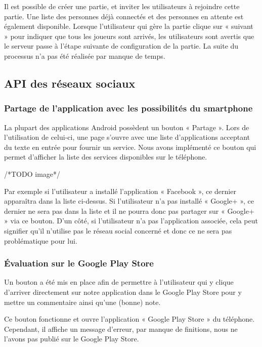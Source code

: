 \documentclass{report}
\begin{document}
Il est possible de créer une partie, et inviter les utilisateurs à  rejoindre cette partie. Une liste des personnes déjà connectés et des personnes en attente est également disponible. Lorsque l’utilisateur qui gère la partie clique sur « suivant » pour indiquer que tous les joueurs sont arrivés, les utilisateurs sont avertis que le serveur passe à l’étape suivante de configuration de la partie. La suite du processus n’a pas été réalisée par manque de temps.

\subsection{API des réseaux sociaux}

\subsubsection{Partage de l’application avec les possibilités du smartphone}

La plupart des applications Android possèdent un bouton « Partage ». Lors de l’utilisation de celui-ci, une page s’ouvre avec une liste d’applications acceptant du texte en entrée pour fournir un service. Nous avons implémenté ce bouton qui permet d’afficher la liste des services disponibles sur le téléphone.

/*TODO image*/

Par exemple si l’utilisateur a installé l’application « Facebook », ce dernier apparaîtra dans la liste ci-dessus. Si l’utilisateur n’a pas installé « Google+ », ce dernier ne sera pas dans la liste et il ne pourra donc pas partager sur « Google+ » via ce bouton. D’un côté, si l’utilisateur n’a pas l’application associée, cela peut signifier qu’il n’utilise pas le réseau social concerné et donc ce ne sera pas problématique pour lui.

\subsubsection{Évaluation sur le Google Play Store}

Un bouton a été mis en place afin de permettre à l’utilisateur qui y clique d’arriver directement sur notre application dans le Google Play Store pour y mettre un commentaire ainsi qu’une (bonne) note.

Ce bouton fonctionne et ouvre l’application « Google Play Store » du téléphone. Cependant, il affiche un message d’erreur, par manque de finitions, nous ne l’avons pas publié sur le Google Play Store.
\end{document}
